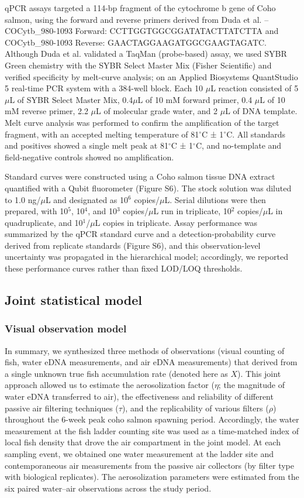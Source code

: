 \documentclass{article}
\begin{document}
qPCR assays targeted a 114-bp fragment of the cytochrome b gene of Coho salmon, using the forward and reverse primers derived from Duda et al. \cite{duda2021} -- COCytb\_980-1093 Forward: CCTTGGTGGCGGATATACTTATCTTA and COCytb\_980-1093 Reverse: GAACTAGGAAGATGGCGAAGTAGATC. Although Duda et al. validated a TaqMan (probe-based) assay, we used SYBR Green chemistry with the SYBR Select Master Mix (Fisher Scientific) and verified specificity by melt-curve analysis; on an Applied Biosystems QuantStudio 5 real-time PCR system with a 384-well block. Each 10 $\mu$L reaction consisted of 5 $\mu$L of SYBR Select Master Mix, 0.4$\mu$L of 10 mM forward primer, 0.4 $\mu$L of 10 mM reverse primer, 2.2 $\mu$L of molecular grade water, and 2 $\mu$L of DNA template. Melt curve analysis was performed to confirm the amplification of the target fragment, with an accepted melting temperature of 81$^\circ$C ± 1$^\circ$C. All standards and positives showed a single melt peak at 81$^\circ$C ± 1$^\circ$C, and no-template and field-negative controls showed no amplification.

Standard curves were constructed using a Coho salmon tissue DNA extract quantified with a Qubit fluorometer (Figure S6). The stock solution was diluted to 1.0 ng/$\mu$L and designated as 10$^6$ copies/$\mu$L. Serial dilutions were then prepared, with 10$^5$, 10$^4$, and 10$^3$ copies/$\mu$L run in triplicate, 10$^2$ copies/$\mu$L in quadruplicate, and 10$^1$/$\mu$L copies in triplicate. Assay performance was summarized by the qPCR standard curve and a detection-probability curve derived from replicate standards (Figure S6), and this observation-level uncertainty was propagated in the hierarchical model; accordingly, we reported these performance curves rather than fixed LOD/LOQ thresholds.

\subsection{Joint statistical model}

\subsubsection{Visual observation model}
In summary, we synthesized three methods of observations (visual counting of fish, water eDNA measurements, and air eDNA measurements) that derived from a single unknown true fish accumulation rate (denoted here as $X$). This joint approach allowed us to estimate the aerosolization factor ($\eta$; the magnitude of water eDNA transferred to air), the effectiveness and reliability of different passive air filtering techniques ($\tau$), and the replicability of various filters ($\rho$) throughout the 6-week peak coho salmon spawning period. Accordingly, the water measurement at the fish ladder counting site was used as a time-matched index of local fish density that drove the air compartment in the joint model. At each sampling event, we obtained one water measurement at the ladder site and contemporaneous air measurements from the passive air collectors (by filter type with biological replicates). The aerosolization parameters were estimated from the six paired water–air observations across the study period.
\end{document}
